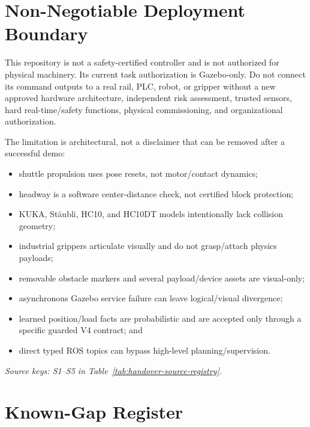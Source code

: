 \section{Non-Negotiable Deployment Boundary}

\begin{safetybox}
This repository is not a safety-certified controller and is not authorized for
physical machinery. Its current task authorization is Gazebo-only. Do not
connect its command outputs to a real rail, PLC, robot, or gripper without a new
approved hardware architecture, independent risk assessment, trusted sensors,
hard real-time/safety functions, physical commissioning, and organizational
authorization.
\end{safetybox}

The limitation is architectural, not a disclaimer that can be removed after a
successful demo:

\begin{itemize}
  \item shuttle propulsion uses pose resets, not motor/contact dynamics;
  \item headway is a software center-distance check, not certified block protection;
  \item KUKA, St\"aubli, HC10, and HC10DT models intentionally lack collision geometry;
  \item industrial grippers articulate visually and do not grasp/attach physics payloads;
  \item removable obstacle markers and several payload/device assets are visual-only;
  \item asynchronous Gazebo service failure can leave logical/visual divergence;
  \item learned position/load facts are probabilistic and are accepted only through
        a specific guarded V4 contract; and
  \item direct typed ROS topics can bypass high-level planning/supervision.
\end{itemize}

\noindent\textit{Source keys: S1--S5 in Table~\ref{tab:handover-source-registry}.}

\section{Known-Gap Register}

